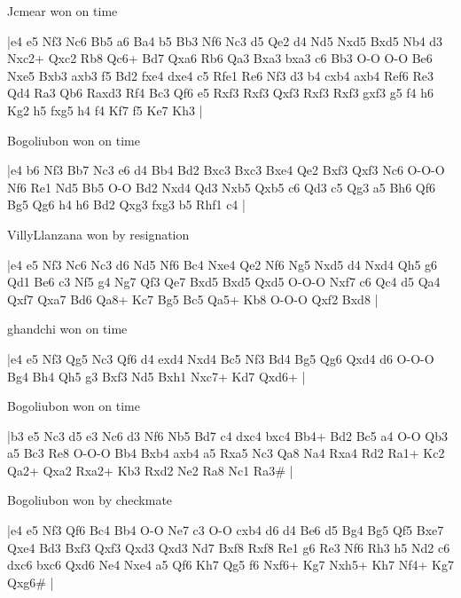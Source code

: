 Jcmear won on time

\makegametitle
|e4 e5 Nf3 Nc6 Bb5 a6 Ba4 b5 Bb3 Nf6 Nc3 d5 Qe2 d4 Nd5 Nxd5 Bxd5 Nb4 d3 Nxc2+ Qxc2 Rb8 Qc6+ Bd7 Qxa6 Rb6 Qa3 Bxa3 bxa3 c6 Bb3 O-O O-O Be6 Nxe5 Bxb3 axb3 f5 Bd2 fxe4 dxe4 c5 Rfe1 Re6 Nf3 d3 b4 cxb4 axb4 Ref6 Re3 Qd4 Ra3 Qb6 Raxd3 Rf4 Bc3 Qf6 e5 Rxf3 Rxf3 Qxf3 Rxf3 Rxf3 gxf3 g5 f4 h6 Kg2 h5 fxg5 h4 f4 Kf7 f5 Ke7 Kh3  |

\showboard

Bogoliubon won on time

\makegametitle
|e4 b6 Nf3 Bb7 Nc3 e6 d4 Bb4 Bd2 Bxc3 Bxc3 Bxe4 Qe2 Bxf3 Qxf3 Nc6 O-O-O Nf6 Re1 Nd5 Bb5 O-O Bd2 Nxd4 Qd3 Nxb5 Qxb5 c6 Qd3 c5 Qg3 a5 Bh6 Qf6 Bg5 Qg6 h4 h6 Bd2 Qxg3 fxg3 b5 Rhf1 c4  |

\showboard

VillyLlanzana won by resignation

\makegametitle
|e4 e5 Nf3 Nc6 Nc3 d6 Nd5 Nf6 Bc4 Nxe4 Qe2 Nf6 Ng5 Nxd5 d4 Nxd4 Qh5 g6 Qd1 Be6 c3 Nf5 g4 Ng7 Qf3 Qe7 Bxd5 Bxd5 Qxd5 O-O-O Nxf7 c6 Qc4 d5 Qa4 Qxf7 Qxa7 Bd6 Qa8+ Kc7 Bg5 Bc5 Qa5+ Kb8 O-O-O Qxf2 Bxd8  |

\showboard

ghandchi won on time

\makegametitle
|e4 e5 Nf3 Qg5 Nc3 Qf6 d4 exd4 Nxd4 Bc5 Nf3 Bd4 Bg5 Qg6 Qxd4 d6 O-O-O Bg4 Bh4 Qh5 g3 Bxf3 Nd5 Bxh1 Nxc7+ Kd7 Qxd6+  |

\showboard

Bogoliubon won on time

\makegametitle
|b3 e5 Nc3 d5 e3 Nc6 d3 Nf6 Nb5 Bd7 c4 dxc4 bxc4 Bb4+ Bd2 Bc5 a4 O-O Qb3 a5 Bc3 Re8 O-O-O Bb4 Bxb4 axb4 a5 Rxa5 Nc3 Qa8 Na4 Rxa4 Rd2 Ra1+ Kc2 Qa2+ Qxa2 Rxa2+ Kb3 Rxd2 Ne2 Ra8 Nc1 Ra3\#  |

\showboard

Bogoliubon won by checkmate

\makegametitle
|e4 e5 Nf3 Qf6 Bc4 Bb4 O-O Ne7 c3 O-O cxb4 d6 d4 Be6 d5 Bg4 Bg5 Qf5 Bxe7 Qxe4 Bd3 Bxf3 Qxf3 Qxd3 Qxd3 Nd7 Bxf8 Rxf8 Re1 g6 Re3 Nf6 Rh3 h5 Nd2 c6 dxc6 bxc6 Qxd6 Ne4 Nxe4 a5 Qf6 Kh7 Qg5 f6 Nxf6+ Kg7 Nxh5+ Kh7 Nf4+ Kg7 Qxg6\#  |


